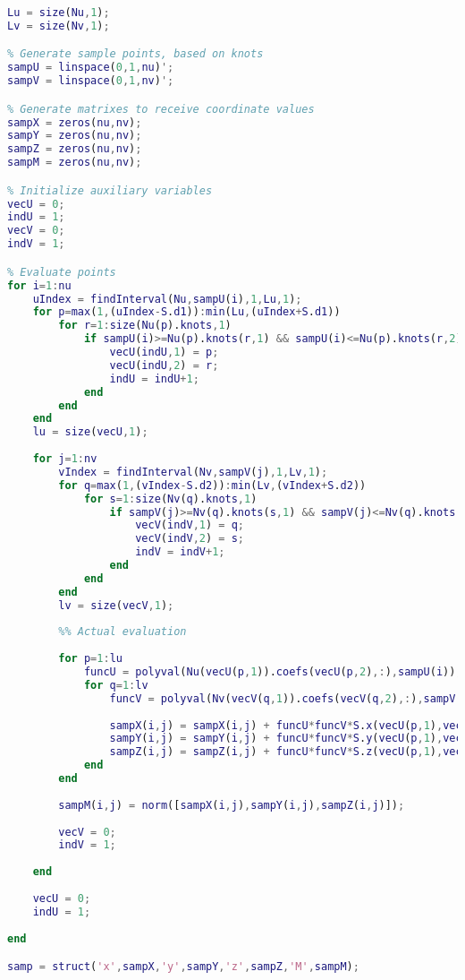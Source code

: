 	\begin{lstlisting}[language=matlab]
% Number of functions for each direction
Lu = size(Nu,1);
Lv = size(Nv,1);

% Generate sample points, based on knots
sampU = linspace(0,1,nu)';
sampV = linspace(0,1,nv)';

% Generate matrixes to receive coordinate values
sampX = zeros(nu,nv);
sampY = zeros(nu,nv);
sampZ = zeros(nu,nv);
sampM = zeros(nu,nv);

% Initialize auxiliary variables
vecU = 0;
indU = 1;
vecV = 0;
indV = 1;

% Evaluate points
for i=1:nu
    uIndex = findInterval(Nu,sampU(i),1,Lu,1);
    for p=max(1,(uIndex-S.d1)):min(Lu,(uIndex+S.d1))
        for r=1:size(Nu(p).knots,1)
            if sampU(i)>=Nu(p).knots(r,1) && sampU(i)<=Nu(p).knots(r,2)
                vecU(indU,1) = p;
                vecU(indU,2) = r;
                indU = indU+1;
            end
        end
    end
    lu = size(vecU,1);
    
    for j=1:nv
        vIndex = findInterval(Nv,sampV(j),1,Lv,1);
        for q=max(1,(vIndex-S.d2)):min(Lv,(vIndex+S.d2))
            for s=1:size(Nv(q).knots,1)
                if sampV(j)>=Nv(q).knots(s,1) && sampV(j)<=Nv(q).knots(s,2)
                    vecV(indV,1) = q;
                    vecV(indV,2) = s;
                    indV = indV+1;
                end
            end
        end 
        lv = size(vecV,1);
        
        %% Actual evaluation
        
        for p=1:lu
            funcU = polyval(Nu(vecU(p,1)).coefs(vecU(p,2),:),sampU(i));
            for q=1:lv
                funcV = polyval(Nv(vecV(q,1)).coefs(vecV(q,2),:),sampV(j));
                
                sampX(i,j) = sampX(i,j) + funcU*funcV*S.x(vecU(p,1),vecV(q,1));
                sampY(i,j) = sampY(i,j) + funcU*funcV*S.y(vecU(p,1),vecV(q,1));
                sampZ(i,j) = sampZ(i,j) + funcU*funcV*S.z(vecU(p,1),vecV(q,1));
            end
        end
        
        sampM(i,j) = norm([sampX(i,j),sampY(i,j),sampZ(i,j)]);
        
        vecV = 0;
        indV = 1;
        
    end
    
    vecU = 0;
    indU = 1;
    
end

samp = struct('x',sampX,'y',sampY,'z',sampZ,'M',sampM);
	\end{lstlisting}
	

